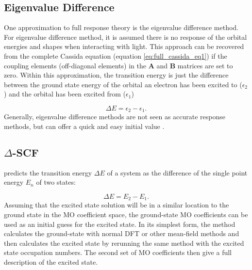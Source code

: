 \subsection{Eigenvalue Difference}
\label{subsec:eigval_diff}
One approximation to full response theory is the eigenvalue difference method. For
eigenvalue difference method, it is assumed there is no response of the orbital 
energies and shapes when interacting with light. This approach can be recovered 
from the complete Cassida equation (equation \ref{eq:full_cassida_eq1}) if the coupling
elements (off-diagonal elements) in the $\mathbf{A}$ and $\mathbf{B}$ matrices are
set to zero. Within this approximation, the transition energy is just the difference
between the ground state energy of the orbital an electron has been excited to ($\epsilon_{\text{2}}$)
and the orbital has been excited from ($\epsilon_{\text{1}}$)

\begin{equation}
\Delta E = \epsilon_{\text{2}} - \epsilon_{\text{1}}.
\end{equation}
%
Generally, eigenvalue difference methods are not seen as accurate response methods,
but can offer a quick and easy initial value \cite{Gimon2009}.

\subsection{$\Delta$-SCF}
\label{subsec{dscf_and_eigdiff}}

\dscf \cite{Jones1989, Hellman2004} predicts the transition energy $\Delta E$ of 
a system as the difference of the single point energy $E_n$ of two states:

\begin{equation}
\Delta E = E_{2} - E_{1}.
\end{equation}
%
Assuming that the excited state solution will be in a similar location to the ground
state in the MO coefficient space, the ground-state MO coefficients can be used 
as an initial guess for the excited state. In its simplest form, the \dscf method 
calculates the ground-state with normal DFT or other mean-field methods and then
calculates the excited state by rerunning the same method with the excited state
occupation numbers. The second set of MO coefficients then give a full description
of the excited state.

